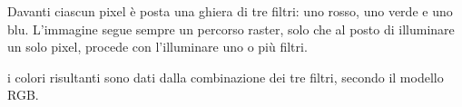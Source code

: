 \documentclass{subfiles}
\begin{document}
Davanti ciascun pixel è posta una ghiera di tre filtri: uno rosso, uno verde e uno blu.
L'immagine segue sempre un percorso raster, solo che al posto di illuminare un solo pixel, procede con l'illuminare uno o più filtri.

\begin{Remark*}
    i colori risultanti sono dati dalla combinazione dei tre filtri, secondo il modello RGB.
\end{Remark*}
\end{document}
